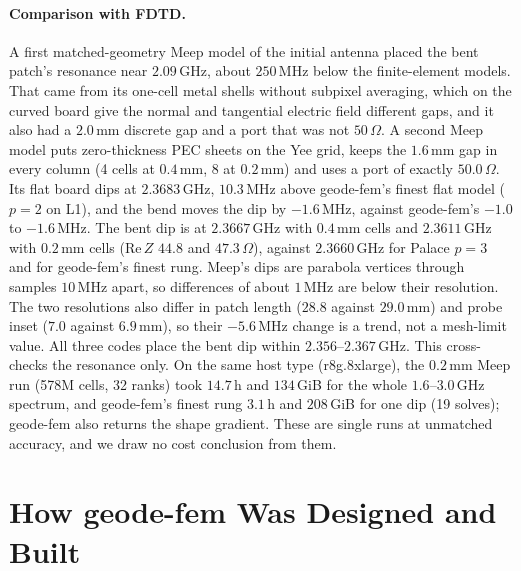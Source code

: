 \documentclass{anvil-paper}
\begin{document}
\paragraph{Comparison with FDTD.}
A first matched-geometry Meep \citep{oskooi2010meep} model of the initial
antenna placed the bent patch's resonance near $2.09$\,GHz, about
$250$\,MHz below the finite-element models. That came from its one-cell
metal shells without subpixel averaging, which on the curved board give
the normal and tangential electric field different gaps, and it also had a
$2.0$\,mm discrete gap and a port that was not $50\,\Omega$. A second Meep
model puts zero-thickness PEC sheets on the Yee grid, keeps the $1.6$\,mm
gap in every column (4 cells at $0.4$\,mm, 8 at $0.2$\,mm) and uses a port of
exactly $50.0\,\Omega$. Its flat board dips at $2.3683$\,GHz, $10.3$\,MHz above
geode-fem's finest flat model ($p = 2$ on L1), and the bend moves the dip by
$-1.6$\,MHz, against geode-fem's $-1.0$ to $-1.6$\,MHz. The bent dip is at
$2.3667$\,GHz with $0.4$\,mm cells and $2.3611$\,GHz with $0.2$\,mm cells
($\mathrm{Re}\,Z$ $44.8$ and $47.3\,\Omega$), against $2.3660$\,GHz for Palace
$p = 3$ and for geode-fem's finest rung. Meep's dips are parabola vertices
through samples $10$\,MHz apart, so differences of about $1$\,MHz are below
their resolution. The two resolutions also differ in patch length ($28.8$
against $29.0$\,mm) and probe inset ($7.0$ against $6.9$\,mm), so their
$-5.6$\,MHz change is a trend, not a mesh-limit value. All three codes place
the bent dip within $2.356$--$2.367$\,GHz. This cross-checks the resonance
only. On the same host type (r8g.8xlarge), the $0.2$\,mm Meep run (578M
cells, 32 ranks) took $14.7$\,h and $134$\,GiB for the whole
$1.6$--$3.0$\,GHz spectrum, and geode-fem's finest rung $3.1$\,h and
$208$\,GiB for one dip (19 solves); geode-fem also returns the shape
gradient. These are single runs at unmatched accuracy, and we draw no cost
conclusion from them.

\section{How geode-fem Was Designed and Built}
\label{sec:built}
\end{document}
